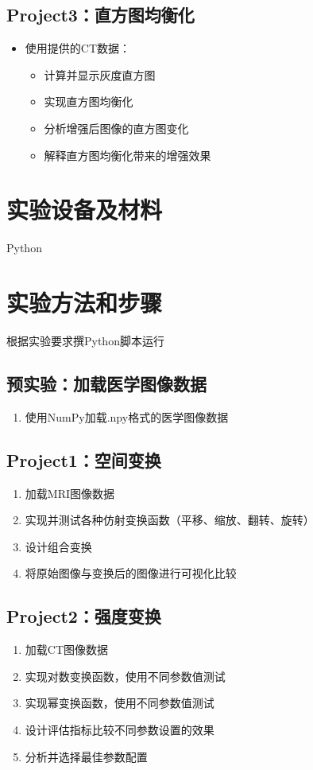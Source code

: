 \documentclass[10.5pt]{config}
\begin{document}
\subsection{Project3：直方图均衡化}
\begin{itemize}
    \item 使用提供的CT数据：
    \begin{itemize}
        \item 计算并显示灰度直方图
        \item 实现直方图均衡化
        \item 分析增强后图像的直方图变化
        \item 解释直方图均衡化带来的增强效果
    \end{itemize}
\end{itemize}

\section{实验设备及材料}
Python

\section{实验方法和步骤}
根据实验要求撰Python脚本运行
\subsection{预实验：加载医学图像数据}
\begin{enumerate}
    \item 使用NumPy加载.npy格式的医学图像数据
\end{enumerate}

\subsection{Project1：空间变换}
\begin{enumerate}
    \item 加载MRI图像数据
    \item 实现并测试各种仿射变换函数（平移、缩放、翻转、旋转）
    \item 设计组合变换
    \item 将原始图像与变换后的图像进行可视化比较
\end{enumerate}

\subsection{Project2：强度变换}
\begin{enumerate}
    \item 加载CT图像数据
    \item 实现对数变换函数，使用不同参数值测试
    \item 实现幂变换函数，使用不同参数值测试
    \item 设计评估指标比较不同参数设置的效果
    \item 分析并选择最佳参数配置
\end{enumerate}
\end{document}
